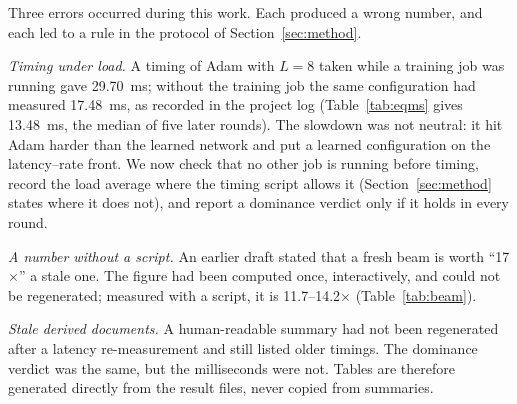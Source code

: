 Three errors occurred during this work. Each produced a wrong number, and each led to a rule in the protocol of Section~\ref{sec:method}.

\emph{Timing under load.} A timing of Adam with $L=8$ taken while a training job was running gave 29.70~ms; without the training job the same configuration had measured 17.48~ms, as recorded in the project log (Table~\ref{tab:eqms} gives 13.48~ms, the median of five later rounds). The slowdown was not neutral: it hit Adam harder than the learned network and put a learned configuration on the latency--rate front. We now check that no other job is running before timing, record the load average where the timing script allows it (Section~\ref{sec:method} states where it does not), and report a dominance verdict only if it holds in every round.

\emph{A number without a script.} An earlier draft stated that a fresh beam is worth ``17$\times$'' a stale one. The figure had been computed once, interactively, and could not be regenerated; measured with a script, it is 11.7--14.2$\times$ (Table~\ref{tab:beam}).

\emph{Stale derived documents.} A human-readable summary had not been regenerated after a latency re-measurement and still listed older timings. The dominance verdict was the same, but the milliseconds were not. Tables are therefore generated directly from the result files, never copied from summaries.
